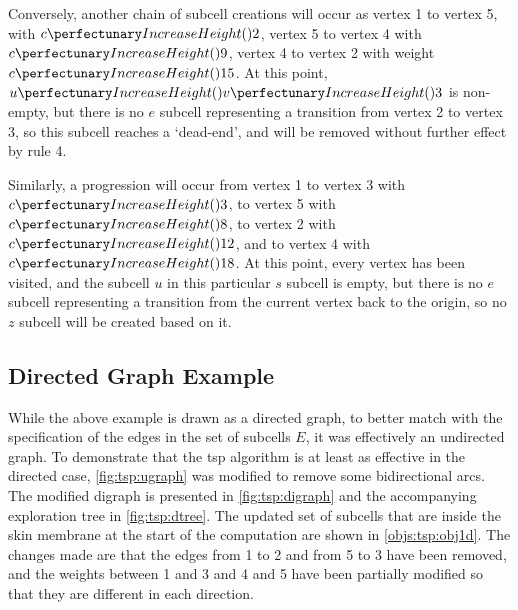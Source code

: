 Conversely, another chain of subcell creations will occur as vertex 1 to vertex 5, with \(\cpfunc{c}{2}\), vertex 5 to vertex 4 with \(\cpfunc{c}{9}\), vertex 4 to vertex 2 with weight \(\cpfunc{c}{15}\).  At this point, \(\cpfunc{u}{\cpfunc{v}{3}}\) is non-empty, but there is no \(e\) subcell representing a transition from vertex 2 to vertex 3, so this subcell reaches a `dead-end', and will be removed without further effect by rule 4.

Similarly, a progression will occur from vertex 1 to vertex 3 with \(\cpfunc{c}{3}\), to vertex 5 with \(\cpfunc{c}{8}\), to vertex 2 with \(\cpfunc{c}{12}\), and to vertex 4 with \(\cpfunc{c}{18}\).  At this point, every vertex has been visited, and the subcell \(u\) in this particular \(s\) subcell is empty, but there is no \(e\) subcell representing a transition from the current vertex back to the origin, so no \(z\) subcell will be created based on it.


\subsection{Directed Graph Example}
While the above example is drawn as a directed graph, to better match with the specification of the edges in the set of subcells \(E\), it was effectively an undirected graph.  To demonstrate that the \gls{tsp} algorithm is at least as effective in the directed case, \cref{fig:tsp:ugraph} was modified to remove some bidirectional arcs.  The modified digraph is presented in \cref{fig:tsp:digraph} and the accompanying exploration tree in \cref{fig:tsp:dtree}.  The updated set of subcells that are inside the skin membrane at the start of the computation are shown in \cref{objs:tsp:obj1d}.  The changes made are that the edges from 1 to 2 and from 5 to 3 have been removed, and the weights between 1 and 3 and 4 and 5 have been partially modified so that they are different in each direction.


